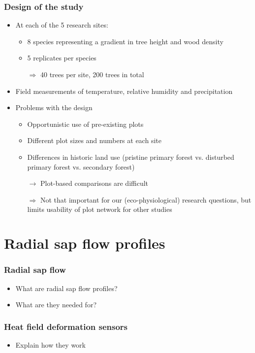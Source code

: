 \documentclass[usepdftitle=false]{beamer}
\newcommand{\rar}{$\rightarrow$}
\newcommand{\Rar}{$\Rightarrow$}
\begin{document}
\begin{frame}
	\frametitle{Design of the study}
\begin{itemize}
	\item At each of the 5 research sites:
	\begin{itemize}
		\item 8 species representing a gradient in tree height and wood density
		\item 5 replicates per species
		\item[\Rar] 40 trees per site, 200 trees in total
	\end{itemize}
	\item Field measurements of temperature, relative humidity and precipitation
	\item Problems with the design
	\begin{itemize}
		\item Opportunistic use of pre-existing plots
		\item Different plot sizes and numbers at each site
		\item Differences in historic land use (pristine primary forest vs. disturbed primary forest vs. secondary forest)
		\item[\rar] Plot-based comparisons are difficult
		\item[\Rar] Not that important for our (eco-physiological) research questions, but limits usability of plot network for other studies
	\end{itemize}
\end{itemize}
\end{frame}



\section{Radial sap flow profiles}
\begin{frame}
	\frametitle{Radial sap flow}
	\begin{itemize}
		\item What are radial sap flow profiles?
		\item What are they needed for?
	\end{itemize}
\end{frame}

\begin{frame}
	\frametitle{Heat field deformation sensors}
	\begin{itemize}
		\item Explain how they work
	\end{itemize}
\end{frame}
\end{document}
